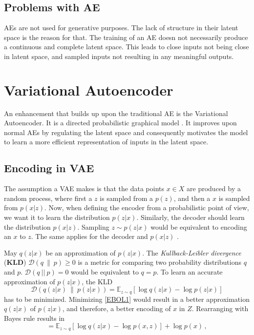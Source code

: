 \documentclass[a4paper]{IEEEtran}
\begin{document}
\subsection{Problems with AE}
AEs are not used for generative purposes. The lack of structure in their latent space is the reason for that. The training of an AE doesn not necessarily produce a continuous and complete latent space. This leads to close inputs not being close in latent space, and sampled inputs not resulting in any meaningful outputs.

\section{Variational Autoencoder}
An enhancement that builds up upon the traditional AE is the Variational Autoencoder. It is a directed probabilistic graphical model \cite{kingma2014autoencoding}. It improves upon normal AEs by regulating the latent space and consequently motivates the model to learn a more efficient representation of inputs in the latent space.

\subsection{Encoding in VAE}
The assumption a VAE makes is that the data points $x \in X$ are produced by a random process, where first a $z$ is sampled from a $p(z)$, and then a $x$ is sampled from $p(x|z)$. Now, when defining the encoder from a probabilistic point of view, we want it to learn the distribution $p(z|x)$. Similarly, the decoder should learn the distribution $p(x|z)$. Sampling $z \sim p(z|x)$ would be equivalent to encoding an $x$ to $z$. The same applies for the decoder and $p(x|z)$ \cite{doersch2016tutorial}.

May $q(z|x)$ be an approximation of $p(z|x)$. The 
\textit{Kullback-Leibler divergence} (\textbf{KLD}) $\mathcal{D}(q \ \| \ p) \geq 0$ is a metric for comparing two probability distributions $q$ and $p$. $\mathcal{D}(q \ || \ p) = 0$ would be equivalent to $q = p$. To learn an accurate approximation of $p(z|x)$, the KLD
\begin{equation}
	\mathcal{D}\left(q(z|x) \ \| \ p(z|x) \right) = \mathbb{E}_{z \sim q}\left[ \log q(z|x) - \log p(z|x) \right]
	\label{EBOL1}
\end{equation}
has to be minimized. Minimizing \eqref{EBOL1} would result in a better approximation $q(z|x)$ of $p(z|x)$, and therefore, a better encoding of $x$ in $Z$. Rearranging with Bayes rule results in
\begin{equation}
	= \mathbb{E}_{z \sim q} \left[ \log q(z|x) - \log p(x,z) \right] + \log p(x)\,,
	\label{EBOL2}
\end{equation}
\end{document}
